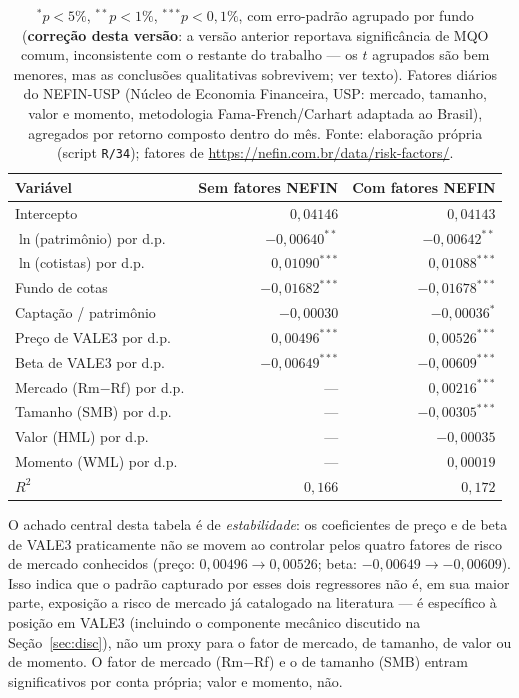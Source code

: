 \documentclass[12pt,a4paper]{article}
\begin{document}
\begin{table}[h]\centering\small
\caption{Regressão empilhada: especificação base e com fatores NEFIN-USP como controle
(erro-padrão agrupado por fundo).}
\label{tab:pool}
\begin{tabular}{@{}lrr@{}}
\toprule
Variável & Sem fatores NEFIN & Com fatores NEFIN \\
\midrule
Intercepto                 & $0{,}04146$  & $0{,}04143$ \\
$\ln$(patrimônio) por d.p. & $-0{,}00640^{**}$ & $-0{,}00642^{**}$ \\
$\ln$(cotistas) por d.p.   & $0{,}01090^{***}$  & $0{,}01088^{***}$ \\
Fundo de cotas             & $-0{,}01682^{***}$ & $-0{,}01678^{***}$ \\
Captação / patrimônio      & $-0{,}00030$  & $-0{,}00036^{*}$ \\
Preço de VALE3 por d.p.    & $0{,}00496^{***}$  & $0{,}00526^{***}$ \\
Beta de VALE3 por d.p.     & $-0{,}00649^{***}$ & $-0{,}00609^{***}$ \\
Mercado (Rm$-$Rf) por d.p. & --- & $0{,}00216^{***}$ \\
Tamanho (SMB) por d.p.     & --- & $-0{,}00305^{***}$ \\
Valor (HML) por d.p.       & --- & $-0{,}00035$ \\
Momento (WML) por d.p.     & --- & $0{,}00019$ \\
\midrule
$R^2$ & $0{,}166$ & $0{,}172$ \\
\bottomrule
\end{tabular}
\caption*{\footnotesize $^{*}p<5\%$, $^{**}p<1\%$, $^{***}p<0{,}1\%$, com erro-padrão agrupado
por fundo (\textbf{correção desta versão}: a versão anterior reportava significância de MQO
comum, inconsistente com o restante do trabalho --- os $t$ agrupados são bem menores, mas as
conclusões qualitativas sobrevivem; ver texto). Fatores diários do NEFIN-USP (Núcleo de Economia
Financeira, USP: mercado, tamanho, valor e momento, metodologia Fama-French/Carhart adaptada ao
Brasil), agregados por retorno composto dentro do mês. Fonte: elaboração própria (script
\texttt{R/34}); fatores de \url{https://nefin.com.br/data/risk-factors/}.}
\end{table}

O achado central desta tabela é de \emph{estabilidade}: os coeficientes de preço e de beta de
VALE3 praticamente não se movem ao controlar pelos quatro fatores de risco de mercado conhecidos
(preço: $0{,}00496\to0{,}00526$; beta: $-0{,}00649\to-0{,}00609$). Isso indica que o padrão
capturado por esses dois regressores não é, em sua maior parte, exposição a risco de mercado já
catalogado na literatura --- é específico à posição em VALE3 (incluindo o componente mecânico
discutido na Seção~\ref{sec:disc}), não um proxy para o fator de mercado, de tamanho, de valor ou
de momento. O fator de mercado (Rm$-$Rf) e o de tamanho (SMB) entram significativos por conta
própria; valor e momento, não.
\end{document}
